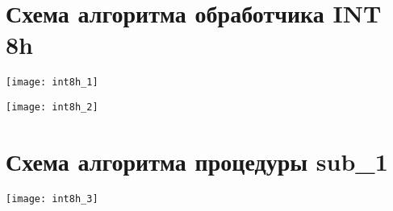 \documentclass[a4paper,14pt]{extreport}
\begin{document}
\pagebreak

\section*{Схема алгоритма обработчика INT 8h}

\texttt{[image: int8h\_1]}

\texttt{[image: int8h\_2]}

\section*{Схема алгоритма процедуры sub\_1}

\texttt{[image: int8h\_3]}
\end{document}
